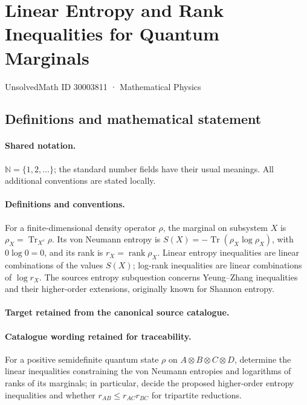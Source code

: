 \documentclass[11pt]{article}
\begin{document}
\setcounter{section}{30003810}
\section{Linear Entropy and Rank Inequalities for Quantum Marginals}\label{30003811}
{\small UnsolvedMath ID 30003811 · Mathematical Physics}
\subsection{Definitions and mathematical statement}

\paragraph{Shared notation.}$\mathbb N=\{1,2,\ldots\}$; the standard number fields have their usual meanings. All additional conventions are stated locally.


\paragraph{Definitions and conventions.}
For a finite-dimensional density operator $\rho$, the marginal on subsystem $X$ is $\rho_X=\operatorname{Tr}_{X^c}\rho$. Its von Neumann entropy is $S(X)=-\operatorname{Tr}(\rho_X\log\rho_X)$, with $0\log0=0$, and its rank is $r_X=\operatorname{rank}\rho_X$. Linear entropy inequalities are linear combinations of the values $S(X)$; log-rank inequalities are linear combinations of $\log r_X$. The source\textquotesingle s entropy subquestion concerns Yeung--Zhang inequalities and their higher-order extensions, originally known for Shannon entropy.

\paragraph{Target retained from the canonical source catalogue.}
\paragraph{Catalogue wording retained for traceability.}
For a positive semidefinite quantum state $\rho$ on $A\otimes B\otimes C\otimes D$, determine the linear inequalities constraining the von Neumann entropies and logarithms of ranks of its marginals; in particular, decide the proposed higher-order entropy inequalities and whether $r_{AB}\leq r_{AC}r_{BC}$ for tripartite reductions.
\end{document}
